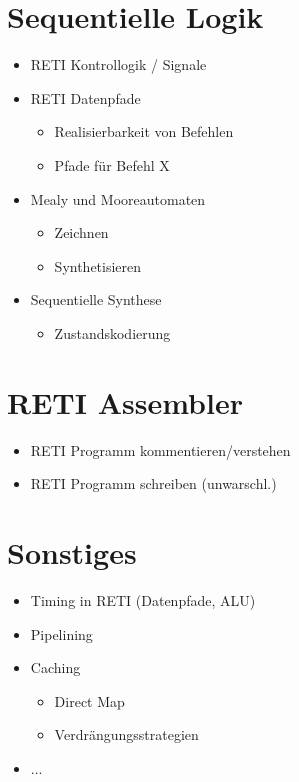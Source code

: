 \documentclass{scrartcl}[9pt, a4paper]
\begin{document}
\pagebreak
\section*{Sequentielle Logik}

\begin{itemize}
	\item RETI Kontrollogik / Signale
	\item RETI Datenpfade
	      \begin{itemize}
	      	\item Realisierbarkeit von Befehlen
	      	\item Pfade für Befehl X
	      \end{itemize}
	\item Mealy und Mooreautomaten
	      \begin{itemize}
	      	\item Zeichnen
	      	\item Synthetisieren
	      \end{itemize}
	\item Sequentielle Synthese
	      \begin{itemize}
	      	\item Zustandskodierung
	      \end{itemize}
\end{itemize}

\section*{RETI Assembler}

\begin{itemize}
	\item RETI Programm kommentieren/verstehen
	\item RETI Programm schreiben (unwarschl.)
\end{itemize}

\section*{Sonstiges}

\begin{itemize}
	\item Timing in RETI (Datenpfade, ALU)
	\item Pipelining
	\item Caching
	      \begin{itemize}
	      	\item Direct Map
	      	\item Verdrängungsstrategien
	      \end{itemize}
	\item ...
\end{itemize}
\end{document}

